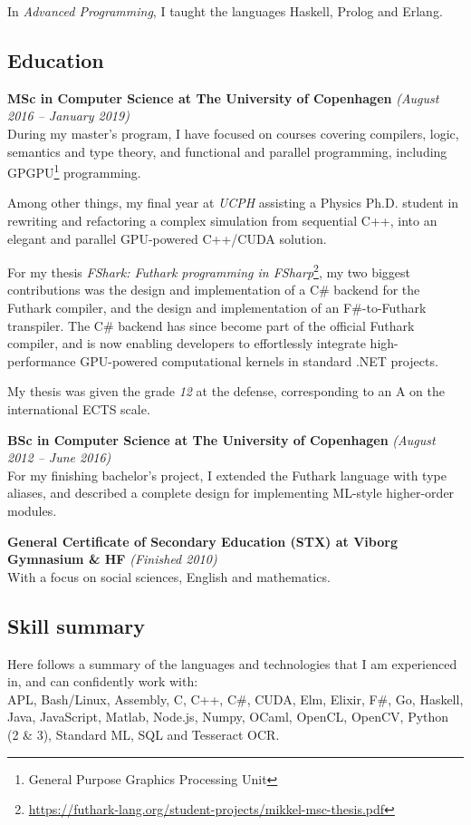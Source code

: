 \documentclass[10pt, a4paper]{article}
\begin{document}
  In \textit{Advanced Programming}, I taught the languages Haskell, Prolog and
  Erlang.

\subsection*{Education}
\textbf{MSc in Computer Science at The University of Copenhagen} \textit{(August 2016 -- January 2019)}\\
  During my master's program, I have focused on courses covering compilers,
  logic, semantics and type theory, and functional and parallel programming,
  including GPGPU\footnote{General Purpose Graphics Processing Unit} programming.

  Among other things, my final year at \textit{UCPH} assisting a Physics Ph.D. student in
  rewriting and refactoring a complex simulation
  from sequential C++, into an elegant and parallel GPU-powered C++/CUDA solution.
  
  For my thesis \textit{FShark: Futhark programming in
    FSharp}\footnote{\url{https://futhark-lang.org/student-projects/mikkel-msc-thesis.pdf}},
  my two biggest contributions was the design and implementation of a C\# backend for
  the Futhark compiler, and the design and implementation of an F\#-to-Futhark transpiler.
  The C\# backend has since become part of the official Futhark compiler, and is
  now enabling developers to effortlessly integrate high-performance GPU-powered
  computational kernels in standard .NET projects.

  My thesis was given the grade \textit{12} at the defense, corresponding to
  an A on the international ECTS scale.
  
\textbf{BSc in Computer Science at The University of Copenhagen} \textit{(August 2012 -- June 2016)}\\
  For my finishing bachelor's project, I extended the Futhark language with type
  aliases, and described a complete design for implementing ML-style higher-order modules.

\textbf{General Certificate of Secondary Education (STX) at Viborg Gymnasium \& HF} \textit{(Finished 2010)}\\
  With a focus on social sciences, English and mathematics.

\subsection*{Skill summary}
Here follows a summary of the languages and technologies that I am experienced in,
and can confidently work with:\\
APL, Bash/Linux, Assembly, C, C++, C\#, CUDA, Elm, Elixir, F\#, Go, Haskell,
Java, JavaScript, Matlab, Node.js, Numpy, OCaml, OpenCL, OpenCV, Python (2 \& 3),
Standard ML, SQL and Tesseract OCR.
\end{document}
